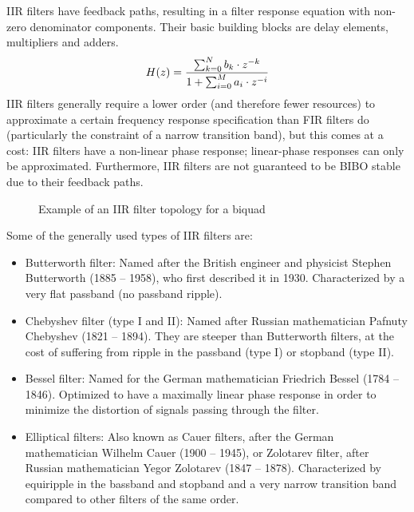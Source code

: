 IIR  filters have  feedback paths,  resulting  in a  filter response  equation
with non-zero  denominator components. Their  basic building blocks  are delay
elements, multipliers and adders.
\begin{equation}
    \label{eq:iir_filter}
    H(z) = \frac{%
            \sum_{k=0}^N b_k \cdot z^{-k}}{%
            1 + \sum_{i=0}^M a_i \cdot z^{-i}}
\end{equation}
IIR filters generally require a lower order (and therefore fewer resources) to
approximate a  certain frequency  response specification  than FIR  filters do
(particularly the constraint of a narrow transition band), but this comes at a
cost:  IIR  filters have a  non-linear phase response;  linear-phase responses
can only  be approximated. Furthermore, IIR  filters are not guaranteed  to be
BIBO stable due to their feedback paths.

\begin{figure}
    \centering
    
    \caption[IIR Filter: Biquad]{Example of an IIR filter topology for a biquad}
    \label{fig:filtertopologies:iir}
\end{figure}

Some of the generally used types of IIR filters are:
\begin{itemize}\tightlist
    \item
        Butterworth  filter: Named after  the British  engineer and  physicist
        Stephen  Butterworth  (1885  --  1958),  who  first  described  it  in
        1930. Characterized by a very flat passband (no passband ripple).
    \item
        Chebyshev filter  (type I  and II): Named after  Russian mathematician
        Pafnuty Chebyshev  (1821 --  1894). They are steeper  than Butterworth
        filters, at the cost of suffering from ripple in the passband (type I)
        or stopband (type II).
    \item
        Bessel  filter: Named for  the German  mathematician Friedrich  Bessel
        (1784 -- 1846). Optimized to have a maximally linear phase response in
        order  to  minimize the  distortion  of  signals passing  through  the
        filter.
    \item
        Elliptical  filters: Also known  as  Cauer filters,  after the  German
        mathematician Wilhelm Cauer (1900 -- 1945), or Zolotarev filter, after
        Russian mathematician Yegor Zolotarev (1847 -- 1878). Characterized by
        equiripple in the  bassband and stopband and a  very narrow transition
        band compared to other filters of the same order.
\end{itemize}

